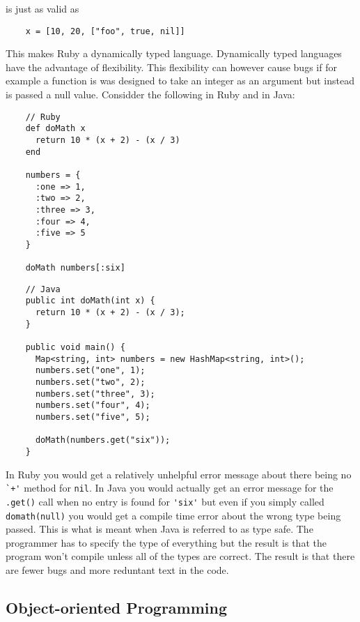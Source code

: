 \documentclass[11pt]{article}
\begin{document}
   
   is just as valid as
   
\begin{verbatim}
    x = [10, 20, ["foo", true, nil]]
\end{verbatim}

   
   This makes Ruby a dynamically typed language.  Dynamically typed
   languages have the advantage of flexibility.  This flexibility can
   however cause bugs if for example a function is was designed to
   take an integer as an argument but instead is passed a null value.
   Considder the following in Ruby and in Java:
   
\begin{verbatim}
    // Ruby
    def doMath x
      return 10 * (x + 2) - (x / 3)
    end
    
    numbers = {
      :one => 1,
      :two => 2,
      :three => 3,
      :four => 4,
      :five => 5
    }
    
    doMath numbers[:six]
\end{verbatim}

   
\begin{verbatim}
    // Java
    public int doMath(int x) {
      return 10 * (x + 2) - (x / 3);
    }
    
    public void main() {
      Map<string, int> numbers = new HashMap<string, int>();
      numbers.set("one", 1);
      numbers.set("two", 2);
      numbers.set("three", 3);
      numbers.set("four", 4);
      numbers.set("five", 5);
      
      doMath(numbers.get("six"));
    }
\end{verbatim}

   
   In Ruby you would get a relatively unhelpful error message about
   there being no \verb|`+'| method for \verb|nil|.  In Java you would
   actually get an error message for the \verb|.get()| call when no
   entry is found for \verb|'six'| but even if you simply called
   \verb|domath(null)| you would get a compile time error about the
   wrong type being passed.  This is what is meant when Java is
   referred to as type safe.  The programmer has to specify the type
   of everything but the result is that the program won't compile
   unless all of the types are correct.  The result is that there are
   fewer bugs and more reduntant text in the code.
   
\subsection*{Object-oriented Programming}
\label{sec-1.4}
\end{document}
